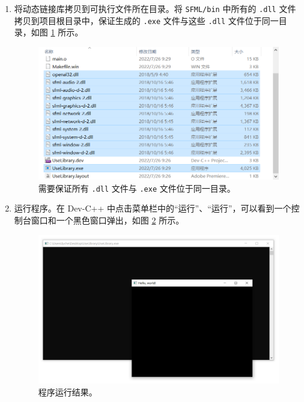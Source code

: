 \begin{enumerate}
\begin{enumerate}
		\item 将动态链接库拷贝到可执行文件所在目录。将 \lstinline[language={}]{SFML/bin} 中所有的 \lstinline[language={}]{.dll} 文件拷贝到项目根目录中，保证生成的 \lstinline[language={}]{.exe} 文件与这些 \lstinline[language={}]{.dll} 文件位于同一目录，如图 \ref{fig:manual-library-6} 所示。

		\begin{figure}
			\centering
			\includegraphics[width=0.75\linewidth]{assets/manual-library-6}
			\caption{需要保证所有 \lstinline[language={}]{.dll} 文件与 \lstinline[language={}]{.exe} 文件位于同一目录。}
			\label{fig:manual-library-6}
		\end{figure}

		\item 运行程序。在 Dev-C++ 中点击菜单栏中的“运行”、“运行”，可以看到一个控制台窗口和一个黑色窗口弹出，如图 \ref{fig:manual-library-7} 所示。

		\begin{figure}
			\centering
			\includegraphics[width=0.75\linewidth]{assets/manual-library-7}
			\caption{程序运行结果。}
			\label{fig:manual-library-7}
		\end{figure}
	\end{enumerate}
\end{enumerate}
